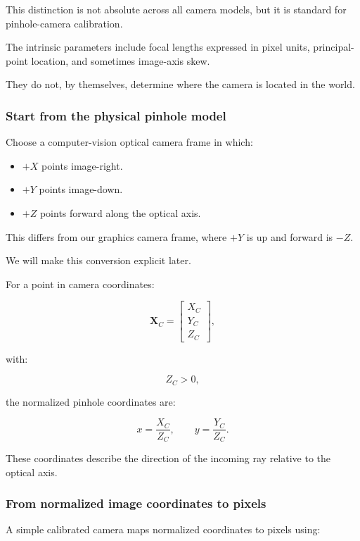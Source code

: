 This distinction is not absolute across all camera models, but it is standard for pinhole-camera calibration.

The intrinsic parameters include focal lengths expressed in pixel units, principal-point location, and sometimes image-axis skew.

They do not, by themselves, determine where the camera is located in the world.

\subsubsection{Start from the physical pinhole model}\label{start-from-the-physical-pinhole-model}

Choose a computer-vision optical camera frame in which:

\begin{itemize}
\tightlist
\item
  \(+X\) points image-right.
\item
  \(+Y\) points image-down.
\item
  \(+Z\) points forward along the optical axis.
\end{itemize}

This differs from our graphics camera frame, where \(+Y\) is up and forward is \(-Z\).

We will make this conversion explicit later.

For a point in camera coordinates:

\[
 \mathbf X_C= \begin{bmatrix} X_C\\Y_C\\Z_C \end{bmatrix},
\]

with:

\[
 Z_C>0,
\]

the normalized pinhole coordinates are:

\[
 \boxed{ x=\frac{X_C}{Z_C}, \qquad y=\frac{Y_C}{Z_C} }.
\]

These coordinates describe the direction of the incoming ray relative to the optical axis.

\subsubsection{From normalized image coordinates to pixels}\label{from-normalized-image-coordinates-to-pixels}

A simple calibrated camera maps normalized coordinates to pixels using:


